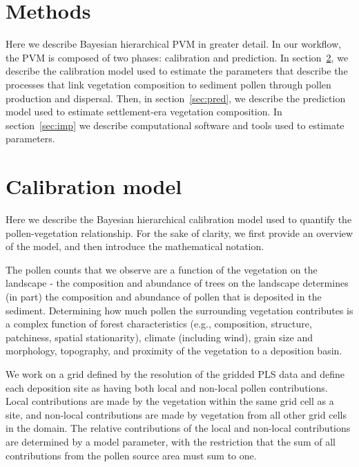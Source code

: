\documentclass[12pt]{article}
\begin{document}
\section{Methods}

Here we describe Bayesian hierarchical PVM in greater detail. In our
workflow, the PVM is composed of two phases: calibration and
prediction. In section~\ref{sec:cal}, we describe the calibration
model used to estimate the parameters that describe the processes that
link vegetation composition to sediment pollen through pollen
production and dispersal. Then, in section~\ref{sec:pred}, we describe
the prediction model used to estimate settlement-era vegetation
composition. In section~\ref{sec:imp} we describe computational
software and tools used to estimate parameters.


\section{Calibration model}
\label{sec:cal}

Here we describe the Bayesian hierarchical calibration model used to
quantify the pollen-vegetation relationship. For the sake of clarity,
we first provide an overview of the model, and then introduce the
mathematical notation.

The pollen counts that we observe are a function of the vegetation on
the landscape - the composition and abundance of trees on the
landscape determines (in part) the composition and abundance of pollen
that is deposited in the sediment. Determining how much pollen the
surrounding vegetation contributes is a complex function of forest
characteristics (e.g., composition, structure, patchiness, spatial
stationarity), climate (including wind), grain size and morphology,
topography, and proximity of the vegetation to a deposition basin.

We work on a grid defined by the resolution of the gridded PLS data
and define each deposition site as having both local and non-local
pollen contributions. Local contributions are made by the vegetation
within the same grid cell as a site, and non-local contributions are
made by vegetation from all other grid cells in the domain. The
relative contributions of the local and non-local contributions are
determined by a model parameter, with the restriction that the sum of
all contributions from the pollen source area must sum to one.
\end{document}
